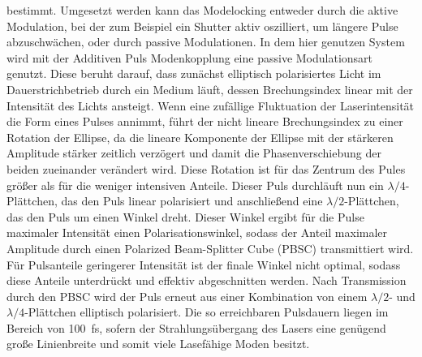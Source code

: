       bestimmt. 
      Umgesetzt werden kann das Modelocking entweder durch die aktive Modulation, bei der zum Beispiel ein Shutter aktiv oszilliert, um längere Pulse abzuschwächen, oder durch passive Modulationen. In dem hier 
      genutzen System wird mit der Additiven Puls Modenkopplung eine passive Modulationsart genutzt. Diese beruht darauf, dass zunächst elliptisch polarisiertes Licht im Dauerstrichbetrieb durch ein Medium 
      läuft, dessen Brechungsindex linear mit der Intensität des Lichts ansteigt. Wenn eine zufällige Fluktuation der Laserintensität die Form eines Pulses annimmt, führt der nicht lineare Brechungsindex 
      zu einer Rotation der Ellipse, da die lineare Komponente der Ellipse mit der stärkeren Amplitude stärker zeitlich verzögert und damit die Phasenverschiebung der beiden zueinander verändert wird. Diese
      Rotation ist für das Zentrum des Pules größer als für die weniger intensiven Anteile. Dieser Puls durchläuft nun ein $\lambda/4$-Plättchen, das den Puls linear polarisiert und anschließend eine  
      $\lambda/2$-Plättchen, das den Puls um einen Winkel dreht. Dieser Winkel ergibt für die Pulse maximaler Intensität einen Polarisationswinkel, sodass der Anteil maximaler Amplitude durch einen 
      Polarized Beam-Splitter Cube (PBSC) transmittiert wird. Für Pulsanteile geringerer Intensität ist der finale Winkel nicht optimal, sodass diese Anteile unterdrückt und effektiv abgeschnitten werden. Nach
      Transmission durch den PBSC wird der Puls erneut aus einer Kombination von einem $\lambda/2$- und $\lambda/4$-Plättchen elliptisch polarisiert. Die so erreichbaren Pulsdauern liegen im Bereich von 
      \SI{100}{\femto\second}, sofern der Strahlungsübergang des Lasers eine genügend große Linienbreite und somit viele Lasefähige Moden besitzt. 

